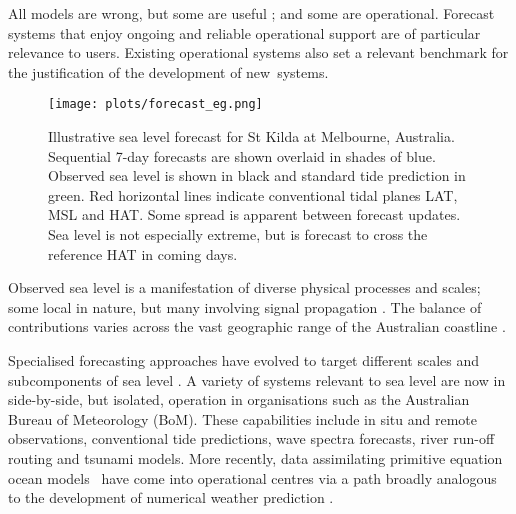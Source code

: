 All models are wrong, but some are useful \cite{Box:1979wz}; and some are operational.        %
Forecast systems that enjoy ongoing and reliable operational support are of particular relevance to users.
Existing operational systems also set a relevant benchmark for the justification of the development of new~systems.  

\begin{figure}[H]
\centering
\texttt{[image: plots/forecast\_eg.png]}
\caption{Illustrative sea level forecast for St Kilda at Melbourne, Australia.  Sequential 7-day forecasts are shown overlaid in shades of blue.  Observed sea level is shown in black and standard tide prediction in green.  Red horizontal lines indicate conventional tidal planes LAT, MSL and HAT.  Some spread is apparent between forecast updates.  Sea level is not especially extreme, but is forecast to cross the reference HAT in coming days.}
\label{fig:fc_eg}
\end{figure}   


Observed sea level is a manifestation of diverse physical processes and scales; some local in nature, but many involving signal propagation \cite{Anonymous:jdDiSHB0}.
The balance of contributions varies across the vast geographic range of the Australian coastline \cite{Haigh:2013bna,Haigh:2013hea,Woodham:2013cl,Ridgway:2004kb,Church:1986tl,Allen:2009tf}.

Specialised forecasting approaches have evolved to target different scales and subcomponents of sea level \cite{Cartwright:2000tt,Petersen:2012kp}.
A variety of systems relevant to sea level are now in side-by-side, but isolated, operation in organisations such as the Australian Bureau of Meteorology (BoM). 
These capabilities include in situ and remote observations, conventional tide predictions, wave spectra forecasts, river run-off routing and tsunami models. 
More recently, data assimilating primitive equation ocean models~\cite{Schiller:2011di} have come into operational centres via a path broadly analogous to the development of numerical weather prediction \cite{Harper:kb}. 

